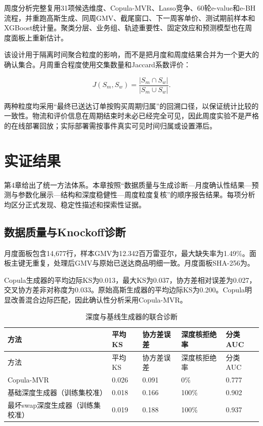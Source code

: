 \documentclass{sufethesismas}
\begin{document}
周度分析完整复用31项候选维度、Copula-MVR、Lasso竞争、60轮e-value和e-BH流程，并重跑高斯生成、同周GMV、截尾窗口、下一周客单价、测试期前样本和XGBoost统计量。聚类分层、业务组、轨迹重要性、固定效应和预测模型也在周度面板上重新估计。

该设计用于隔离时间聚合粒度的影响，而不是把月度和周度结果合并为一个更大的确认集合。月周重合程度使用交集数量和Jaccard系数评价：

\[
J(S_m,S_w)=\frac{|S_m\cap S_w|}{|S_m\cup S_w|}.
\]

两种粒度均采用``最终已送达订单按购买周期归属''的回溯口径，以保证统计比较的一致性。物流和评价信息在周期结束时未必已经完全可见，因此周度实验不是严格的在线部署回放；实际部署需按事件真实可见时间归属或设置滞后。

\chapter{实证结果}

第4章给出了统一方法体系。本章按照``数据质量与生成诊断---月度确认性结果---预测与参数化展示---结构和深度稳健性---周度粒度复核''的顺序报告结果。每项分析均区分正式发现、稳定性描述和探索性证据。

\section{数据质量与Knockoff诊断}

月度面板包含14,677行，样本GMV为12.342百万雷亚尔，最大缺失率为1.49\%。面板主键无重复，处理后GMV与原始已送达商品明细一致。月度面板SHA-256为\texttt{{\scriptsize{}}}。

Copula生成器的平均边际KS为0.013，最大KS为0.037，协方差相对误差为0.027，交叉协方差非对称度为0.033。原始高斯生成器的平均边际KS为0.200。Copula明显改善混合边际匹配，因此确认性分析采用Copula-MVR。

\begin{longtable}[]{@{}lllll@{}}
\caption{深度与基线生成器的联合诊断}\tabularnewline
\toprule\noalign{}
方法 & 平均KS & 协方差误差 & 深度核拒绝率 & 分类AUC \\
\midrule\noalign{}
\endfirsthead
\toprule\noalign{}
方法 & 平均KS & 协方差误差 & 深度核拒绝率 & 分类AUC \\
\midrule\noalign{}
\endhead
\bottomrule\noalign{}
\endlastfoot
Copula-MVR & 0.026 & 0.091 & 0\% & 0.777 \\
基础深度生成器（训练集校准） & 0.018 & 0.166 & 100\% & 0.902 \\
最坏swap深度生成器（训练集校准） & 0.019 & 0.188 & 100\% & 0.937 \\
\end{longtable}
\end{document}
